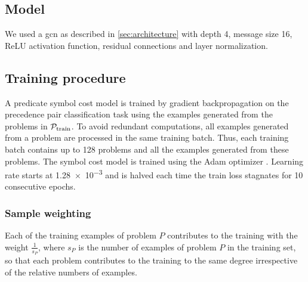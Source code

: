 \subsection{Model}

We used a \gls{gcn} as described in \cref{sec:architecture}
with depth 4, message size 16, ReLU activation function,
residual connections and layer normalization.

\subsection{Training procedure}

A predicate symbol cost model is trained by gradient backpropagation
on the precedence pair classification task
using the examples generated from the problems in $\operatorname{\mathcal{P}_{\mathrm{train}}}$.
To avoid redundant computations, all examples generated from a problem are processed in the same training batch.
Thus, each training batch contains up to \num{128} problems and all the examples generated from these problems.
The symbol cost model is trained using the Adam optimizer \cite{Kingma2014}.
Learning rate starts at \num{1.28e-3}
and is halved each time the train loss stagnates for 10 consecutive epochs.

\subsubsection{Sample weighting}
Each of the training examples of problem $P$ contributes to the training with the weight $\frac{1}{s_P}$,
where $s_P$ is the number of examples of problem $P$ in the training set,
so that each problem contributes to the training to the same degree irrespective of the relative numbers of examples.

